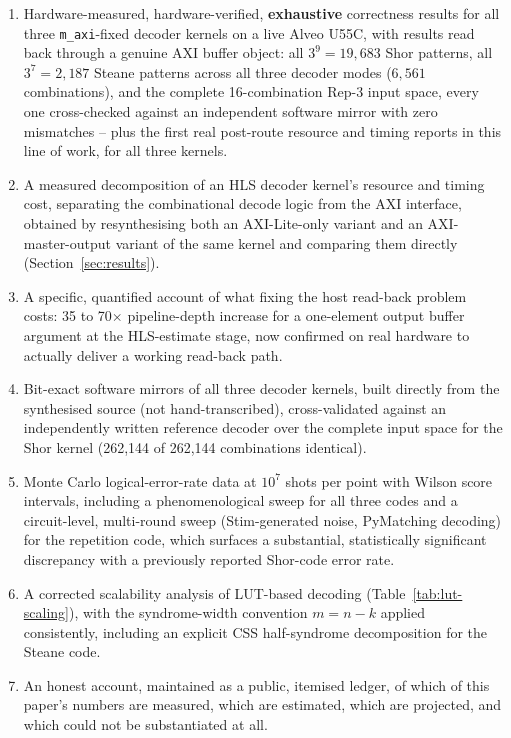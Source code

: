\begin{enumerate}
\item Hardware-measured, hardware-verified, \textbf{exhaustive} correctness results for all three \texttt{m\_axi}-fixed decoder kernels on a live Alveo U55C, with results read back through a genuine AXI buffer object: all $3^9=19{,}683$ Shor patterns, all $3^7=2{,}187$ Steane patterns across all three decoder modes ($6{,}561$ combinations), and the complete 16-combination Rep-3 input space, every one cross-checked against an independent software mirror with zero mismatches -- plus the first real post-route resource and timing reports in this line of work, for all three kernels.
\item A measured decomposition of an HLS decoder kernel's resource and timing cost, separating the combinational decode logic from the AXI interface, obtained by resynthesising both an AXI-Lite-only variant and an AXI-master-output variant of the same kernel and comparing them directly (Section~\ref{sec:results}).
\item A specific, quantified account of what fixing the host read-back problem costs: 35 to 70\(\times\) pipeline-depth increase for a one-element output buffer argument at the HLS-estimate stage, now confirmed on real hardware to actually deliver a working read-back path.
\item Bit-exact software mirrors of all three decoder kernels, built directly from the synthesised source (not hand-transcribed), cross-validated against an independently written reference decoder over the complete input space for the Shor kernel (262,144 of 262,144 combinations identical).
\item Monte Carlo logical-error-rate data at \(10^7\) shots per point with Wilson score intervals, including a phenomenological sweep for all three codes and a circuit-level, multi-round sweep (Stim-generated noise, PyMatching decoding) for the repetition code, which surfaces a substantial, statistically significant discrepancy with a previously reported Shor-code error rate.
\item A corrected scalability analysis of LUT-based decoding (Table~\ref{tab:lut-scaling}), with the syndrome-width convention \(m=n-k\) applied consistently, including an explicit CSS half-syndrome decomposition for the Steane code.
\item An honest account, maintained as a public, itemised ledger, of which of this paper's numbers are measured, which are estimated, which are projected, and which could not be substantiated at all.
\end{enumerate}
